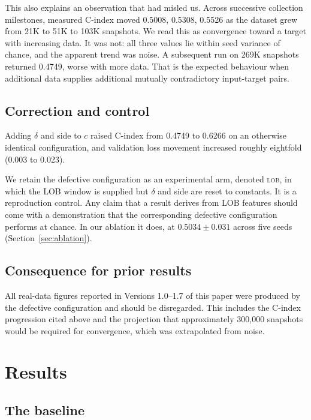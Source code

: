 \documentclass[11pt]{article}
\begin{document}
This also explains an observation that had misled us. Across successive
collection milestones, measured C-index moved 0.5008, 0.5308, 0.5526 as the
dataset grew from 21K to 51K to 103K snapshots. We read this as convergence
toward a target with increasing data. It was not: all three values lie within
seed variance of chance, and the apparent trend was noise. A subsequent run on 269K snapshots returned 0.4749, worse with more data. That
is the expected behaviour when additional data supplies additional mutually
contradictory input-target pairs.

\subsection{Correction and control}

Adding $\delta$ and side to $c$ raised C-index from 0.4749 to 0.6266 on an
otherwise identical configuration, and validation loss movement increased
roughly eightfold (0.003 to 0.023).

We retain the defective configuration as an experimental arm, denoted
\textsc{lob}, in which the LOB window is supplied but $\delta$ and side are
reset to constants. It is a reproduction control. Any claim that a result derives from LOB features
should come with a demonstration that the corresponding defective configuration
performs at chance. In our ablation it
does, at $0.5034 \pm 0.031$ across five seeds
(Section~\ref{sec:ablation}).

\subsection{Consequence for prior results}

All real-data figures reported in Versions 1.0--1.7 of this paper were produced
by the defective configuration and should be disregarded. This includes the
C-index progression cited above and the projection that approximately 300{,}000
snapshots would be required for convergence, which was extrapolated from noise.

\section{Results}
\label{sec:results}

\subsection{The baseline}
\label{sec:baseline}
\end{document}
